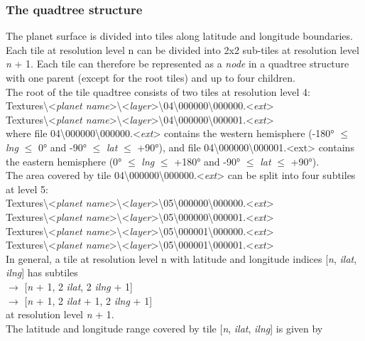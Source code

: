 \documentclass[Orbiter Developer Manual.tex]{subfiles}
\begin{document}
\subsubsection{The quadtree structure}
\label{sssec:quadtree_struct}
The planet surface is divided into tiles along latitude and longitude boundaries. Each tile at resolution level n can be divided into 2x2 sub-tiles at resolution level \textit{n} + 1. Each tile can therefore be represented as a \textit{node} in a quadtree structure with one parent (except for the root tiles) and up to four children.\\
The root of the tile quadtree consists of two tiles at resolution level 4:\\
\indent Textures\textbackslash <\textit{planet name}>\textbackslash <\textit{layer}>\textbackslash 04\textbackslash 000000\textbackslash 000000.<\textit{ext}>\\
\indent Textures\textbackslash <\textit{planet name}>\textbackslash <\textit{layer}>\textbackslash 04\textbackslash 000000\textbackslash 000001.<\textit{ext}>\\
where file 04\textbackslash 000000\textbackslash 000000.<\textit{ext}> contains the western hemisphere (-180° $\leq$ \textit{lng} $\leq$ 0° and -90° $\leq$ \textit{lat} $\leq$ +90°), and file 04\textbackslash 000000\textbackslash 000001.<ext> contains the eastern hemisphere (0° $\leq$ \textit{lng} $\leq$ +180° and -90° $\leq$ \textit{lat} $\leq$ +90°).\\
The area covered by tile 04\textbackslash 000000\textbackslash 000000.<\textit{ext}> can be split into four subtiles at level 5:\\
\indent Textures\textbackslash <\textit{planet name}>\textbackslash <\textit{layer}>\textbackslash 05\textbackslash 000000\textbackslash 000000.<\textit{ext}>\\
\indent Textures\textbackslash <\textit{planet name}>\textbackslash <\textit{layer}>\textbackslash 05\textbackslash 000000\textbackslash 000001.<\textit{ext}>\\
\indent Textures\textbackslash <\textit{planet name}>\textbackslash <\textit{layer}>\textbackslash 05\textbackslash 000001\textbackslash 000000.<\textit{ext}>\\
\indent Textures\textbackslash <\textit{planet name}>\textbackslash <\textit{layer}>\textbackslash 05\textbackslash 000001\textbackslash 000001.<\textit{ext}>\\
In general, a tile at resolution level n with latitude and longitude indices [\textit{n}, \textit{ilat}, \textit{ilng}] has subtiles\\
 $\rightarrow$ [\textit{n} + 1, 2 \textit{ilat}, 2 \textit{ilng} + 1]\\
 $\rightarrow$ [\textit{n} + 1, 2 \textit{ilat} + 1, 2 \textit{ilng} + 1]\\
at resolution level \textit{n} + 1.\\
The latitude and longitude range covered by tile [\textit{n}, \textit{ilat}, \textit{ilng}] is given by
\end{document}
